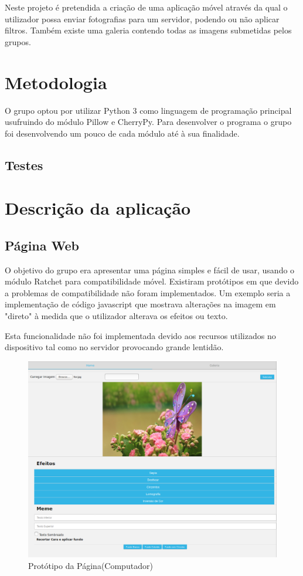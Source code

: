 \documentclass{report}
\begin{document}
Neste projeto é pretendida a criação de uma aplicação móvel através da qual o utilizador possa enviar fotografias para um servidor, podendo ou não aplicar filtros. Também existe uma galeria contendo todas as imagens submetidas pelos grupos.

\chapter{Metodologia}
\label{chap.metodologia}

O grupo optou por utilizar Python 3 como linguagem de programação principal usufruindo do módulo Pillow e CherryPy. Para desenvolver o programa o grupo foi desenvolvendo um pouco de cada módulo até à sua finalidade.

\section{Testes}


\chapter{Descrição da aplicação}
\label{chap.desc}

\section{Página Web}

O objetivo do grupo era apresentar uma página simples e fácil de usar, usando o módulo Ratchet para compatibilidade móvel. Existiram protótipos em que devido a problemas de compatibilidade não foram implementados. Um exemplo seria a implementação de código javascript que mostrava alterações na imagem em "direto" à medida que o utilizador alterava os efeitos ou texto. 

Esta funcionalidade não foi implementada devido aos recursos utilizados no dispositivo tal como no servidor provocando grande lentidão.
\begin{figure}[h]
 \center
 \includegraphics[scale=0.5]{prototype.png}
 \caption{Protótipo da Página(Computador)}
 \label{ProtPag}
\end{figure}
\end{document}
